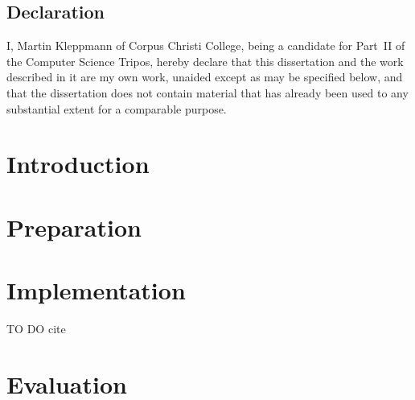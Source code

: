 \documentclass[twoside,notitlepage]{report}
\begin{document}
\section*{Declaration}

I, Martin Kleppmann of Corpus Christi College, being a candidate for Part~II of the Computer
Science Tripos, hereby declare that this dissertation and the work described in it are my own
work, unaided except as may be specified below, and that the dissertation does not contain
material that has already been used to any substantial extent for a comparable purpose.

\vspace{20mm}
\vspace{12mm}
\cleardoublepage

\tableofcontents
\chapter{Introduction}

\chapter{Preparation}




\chapter{Implementation}



TO DO cite \cite{Mirtich:96,Moeller:97}

\chapter{Evaluation}
\end{document}
